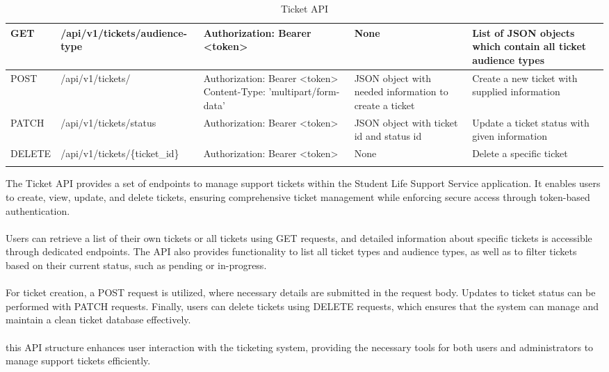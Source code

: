 \begin{longtable}{|m{1.6cm}|m{5cm}|m{3cm}|m{3cm}|m{3.2cm}|}
	GET & /api/v1/tickets/audience-type & Authorization: Bearer <token> & None & List of JSON objects which contain all ticket audience types \\ \hline
	
	
	POST & /api/v1/tickets/ & Authorization: Bearer <token> \newline Content-Type: 'multipart/form-data' & JSON object with needed information to create a ticket & Create a new ticket with supplied information \\ \hline
	
	
	PATCH & /api/v1/tickets/status & Authorization: Bearer <token> & JSON object with ticket id and status id & Update a ticket status with given information \\ \hline
	
	DELETE & /api/v1/tickets/\{ticket\_id\} & Authorization: Bearer <token> & None & Delete a specific ticket \\ \hline
	
	\caption{Ticket API}
	\label{tab:ticket-api}
	
\end{longtable}

\vspace*{0.8cm}

The Ticket API provides a set of endpoints to manage support tickets within the Student Life Support Service application. It enables users to create, view, update, and delete tickets, ensuring comprehensive ticket management while enforcing secure access through token-based authentication. \\ \\
Users can retrieve a list of their own tickets or all tickets using GET requests, and detailed information about specific tickets is accessible through dedicated endpoints. The API also provides functionality to list all ticket types and audience types, as well as to filter tickets based on their current status, such as pending or in-progress. \\ \\
For ticket creation, a POST request is utilized, where necessary details are submitted in the request body. Updates to ticket status can be performed with PATCH requests. Finally, users can delete tickets using DELETE requests, which ensures that the system can manage and maintain a clean ticket database effectively.\\ \\
this API structure enhances user interaction with the ticketing system, providing the necessary tools for both users and administrators to manage support tickets efficiently.

